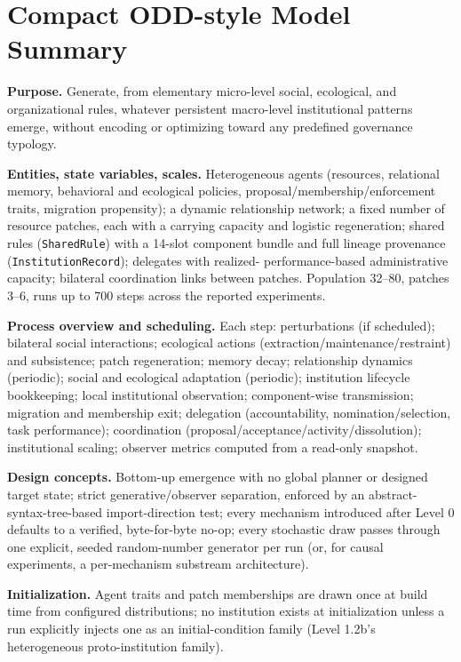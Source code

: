 \section{Compact ODD-style Model Summary}
\label{sec:appendix-odd}

\textbf{Purpose.} Generate, from elementary micro-level social,
ecological, and organizational rules, whatever persistent macro-level
institutional patterns emerge, without encoding or optimizing toward any
predefined governance typology.

\textbf{Entities, state variables, scales.} Heterogeneous agents
(resources, relational memory, behavioral and ecological policies,
proposal/membership/enforcement traits, migration propensity); a dynamic
relationship network; a fixed number of resource patches, each with a
carrying capacity and logistic regeneration; shared rules
(\texttt{SharedRule}) with a 14-slot component bundle and full lineage
provenance (\texttt{InstitutionRecord}); delegates with realized-
performance-based administrative capacity; bilateral coordination links
between patches. Population 32--80, patches 3--6, runs up to 700 steps
across the reported experiments.

\textbf{Process overview and scheduling.} Each step: perturbations (if
scheduled); bilateral social interactions; ecological actions
(extraction/maintenance/restraint) and subsistence; patch regeneration;
memory decay; relationship dynamics (periodic); social and ecological
adaptation (periodic); institution lifecycle bookkeeping; local
institutional observation; component-wise transmission; migration and
membership exit; delegation (accountability, nomination/selection, task
performance); coordination (proposal/acceptance/activity/dissolution);
institutional scaling; observer metrics computed from a read-only
snapshot.

\textbf{Design concepts.} Bottom-up emergence with no global planner or
designed target state; strict generative/observer separation, enforced by
an abstract-syntax-tree-based import-direction test; every mechanism
introduced after Level 0 defaults to a verified, byte-for-byte no-op;
every stochastic draw passes through one explicit, seeded random-number
generator per run (or, for causal experiments, a per-mechanism substream
architecture).

\textbf{Initialization.} Agent traits and patch memberships are drawn once
at build time from configured distributions; no institution exists at
initialization unless a run explicitly injects one as an initial-condition
family (Level 1.2b's heterogeneous proto-institution family).

